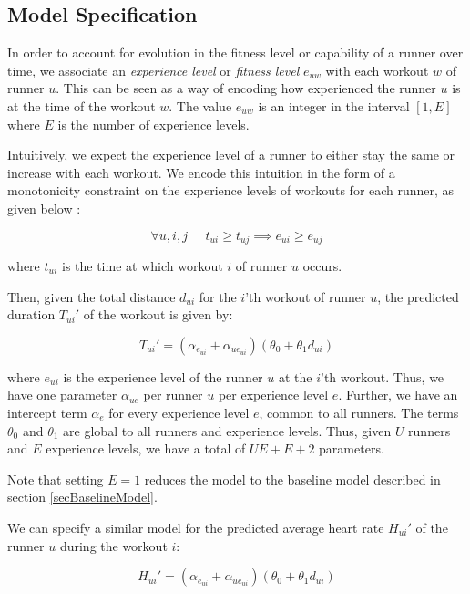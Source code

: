 \documentclass{acm_proc_article-sp}
\begin{document}
\subsection{Model Specification}
In order to account for evolution in the fitness level or capability of a runner over time,  we associate an \emph{experience level} or \emph{fitness level} $e_{uw}$ with each workout $w$ of runner $u$. This can be seen as a way of encoding how experienced the runner $u$ is at the time of the workout $w$. The value $e_{uw}$ is an integer in the interval $[1, E]$ where $E$ is the number of experience levels.

Intuitively, we expect the experience level of a runner to either stay the same or increase with each workout. We encode this intuition in the form of a monotonicity constraint on the experience levels of workouts for each runner, as given below \cite{www13}:

$$\forall u,i,j \;\;\;\;\; t_{ui} \geq t_{uj} \implies e_{ui} \geq e_{uj}$$

where $t_{ui}$ is the time at which workout $i$ of runner $u$ occurs.

Then, given the total distance $d_{ui}$ for the $i$'th workout of runner $u$, the predicted duration $T_{ui}'$ of the workout is given by:

\begin{equation}
\label{eqnModelDuration}
T_{ui}' = (\alpha_{e_{ui}} + \alpha_{ue_{ui}})(\theta_0 + \theta_1 d_{ui})
\end{equation}


where $e_{ui}$ is the experience level of the runner $u$ at the $i$'th workout. Thus, we have one parameter $\alpha_{ue}$ per runner $u$ per experience level $e$. Further, we have an intercept term $\alpha_e$ for every experience level $e$, common to all runners. The terms $\theta_0$ and $\theta_1$ are global to all runners and experience levels. Thus, given $U$ runners and $E$ experience levels, we have a total of $UE + E + 2$ parameters.

Note that setting $E = 1$ reduces the model to the baseline model described in section \ref{secBaselineModel}.

We can specify a similar model for the predicted average heart rate $H_{ui}'$ of the runner $u$ during the workout $i$:

\begin{equation}
\label{eqnModelAvgHr}
H_{ui}' = (\alpha_{e_{ui}} + \alpha_{ue_{ui}})(\theta_0 + \theta_1 d_{ui})
\end{equation}
\end{document}
